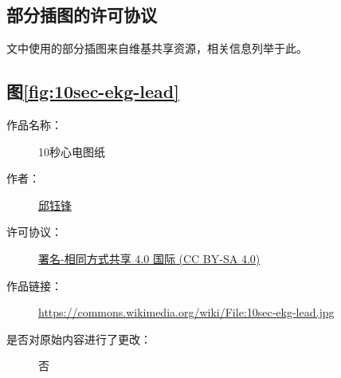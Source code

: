 \begin{appendix}

    \begingroup
    \renewcommand{\clearpage}{\relax}
    \listoftodos
    \endgroup

    \listoffigures
    \listoffigureEng


    \chapter*{部分插图的许可协议}\label{ch:license}

    文中使用的部分插图来自维基共享资源，相关信息列举于此。

    \section*{图\ref{fig:10sec-ekg-lead}}

    \begin{description}
        \item[作品名称：]10秒心电图纸
        \item[作者：]\href{https://zh.wikipedia.org/wiki/User:Kuyohong}{邱钰锋}
        \item[许可协议：]\href{https://creativecommons.org/licenses/by/4.0/}{署名-相同方式共享 4.0 国际 (CC BY-SA 4.0)}
        \item[作品链接：]\url{https://commons.wikimedia.org/wiki/File:10sec-ekg-lead.jpg}
        \item[是否对原始内容进行了更改：]否
    \end{description}

\end{appendix}
